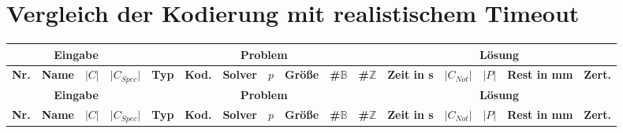 \section{Vergleich der Kodierung mit realistischem Timeout}
\begin{landscape}
    \begin{longtable}{|c|c|c|c|c|l|c|c|c|c|c|c|c|c|c|c|}
            \hline
            \multicolumn{4}{|c|}{\textbf{Eingabe}} & \multicolumn{7}{c|}{\textbf{Problem}} & \multicolumn{5}{c|}{\textbf{Lösung}} \\
            \hline
            \textbf{Nr.} & \textbf{Name} & \textbf{$\lvert C \rvert$} & \textbf{$\lvert C_{Spec} \rvert$} & \textbf{Typ} & \textbf{Kod.} & \textbf{Solver} & \textbf{$p$} & \textbf{Größe} & \textbf{\#$\mathbb{B}$} & \textbf{\#$\mathbb{Z}$} & \textbf{Zeit in s} & \textbf{$\lvert C_{Not} \rvert$} & \textbf{$\lvert P \rvert$} & \textbf{Rest in mm} & \textbf{Zert.} \\
            \hline
            \endfirsthead

            \hline
            \multicolumn{4}{|c|}{\textbf{Eingabe}} & \multicolumn{7}{c|}{\textbf{Problem}} & \multicolumn{5}{c|}{\textbf{Lösung}} \\
            \hline
            \textbf{Nr.} & \textbf{Name} & \textbf{$\lvert C \rvert$} & \textbf{$\lvert C_{Spec} \rvert$} & \textbf{Typ} & \textbf{Kod.} & \textbf{Solver} & \textbf{$p$} & \textbf{Größe} & \textbf{\#$\mathbb{B}$} & \textbf{\#$\mathbb{Z}$} & \textbf{Zeit in s} & \textbf{$\lvert C_{Not} \rvert$} & \textbf{$\lvert P \rvert$} & \textbf{Rest in mm} & \textbf{Zert.} \\
            \hline
            \endhead


\end{longtable}
\end{landscape}

